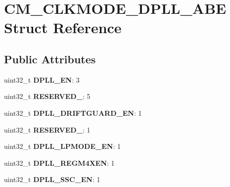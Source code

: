 \hypertarget{structCM__CLKMODE__DPLL__ABE}{\section{C\-M\-\_\-\-C\-L\-K\-M\-O\-D\-E\-\_\-\-D\-P\-L\-L\-\_\-\-A\-B\-E Struct Reference}
\label{structCM__CLKMODE__DPLL__ABE}
}
\subsection*{Public Attributes}
\begin{DoxyCompactItemize}
\item 
\hypertarget{structCM__CLKMODE__DPLL__ABE_ab9198ac4501aed4ba8e54884b057fced}{uint32\-\_\-t {\bfseries D\-P\-L\-L\-\_\-\-E\-N}\-: 3}\label{structCM__CLKMODE__DPLL__ABE_ab9198ac4501aed4ba8e54884b057fced}

\item 
\hypertarget{structCM__CLKMODE__DPLL__ABE_acbc650a671fc175b47b78a68692eae96}{uint32\-\_\-t {\bfseries R\-E\-S\-E\-R\-V\-E\-D\-\_}\-: 5}\label{structCM__CLKMODE__DPLL__ABE_acbc650a671fc175b47b78a68692eae96}

\item 
\hypertarget{structCM__CLKMODE__DPLL__ABE_a979ed4625d978104b263118f4e21af73}{uint32\-\_\-t {\bfseries D\-P\-L\-L\-\_\-\-D\-R\-I\-F\-T\-G\-U\-A\-R\-D\-\_\-\-E\-N}\-: 1}\label{structCM__CLKMODE__DPLL__ABE_a979ed4625d978104b263118f4e21af73}

\item 
\hypertarget{structCM__CLKMODE__DPLL__ABE_ac5beefb14c50747e23a1ac532efbd745}{uint32\-\_\-t {\bfseries R\-E\-S\-E\-R\-V\-E\-D\-\_}\-: 1}\label{structCM__CLKMODE__DPLL__ABE_ac5beefb14c50747e23a1ac532efbd745}

\item 
\hypertarget{structCM__CLKMODE__DPLL__ABE_a19d1f29fc62c54456fcb7d86dea4894a}{uint32\-\_\-t {\bfseries D\-P\-L\-L\-\_\-\-L\-P\-M\-O\-D\-E\-\_\-\-E\-N}\-: 1}\label{structCM__CLKMODE__DPLL__ABE_a19d1f29fc62c54456fcb7d86dea4894a}

\item 
\hypertarget{structCM__CLKMODE__DPLL__ABE_ab057d7edb4ff9ff96f4ecd46a3da4500}{uint32\-\_\-t {\bfseries D\-P\-L\-L\-\_\-\-R\-E\-G\-M4\-X\-E\-N}\-: 1}\label{structCM__CLKMODE__DPLL__ABE_ab057d7edb4ff9ff96f4ecd46a3da4500}

\item 
\hypertarget{structCM__CLKMODE__DPLL__ABE_ad95e734366c9663712e1df36a572826e}{uint32\-\_\-t {\bfseries D\-P\-L\-L\-\_\-\-S\-S\-C\-\_\-\-E\-N}\-: 1}\label{structCM__CLKMODE__DPLL__ABE_ad95e734366c9663712e1df36a572826e}


\end{DoxyCompactItemize}

